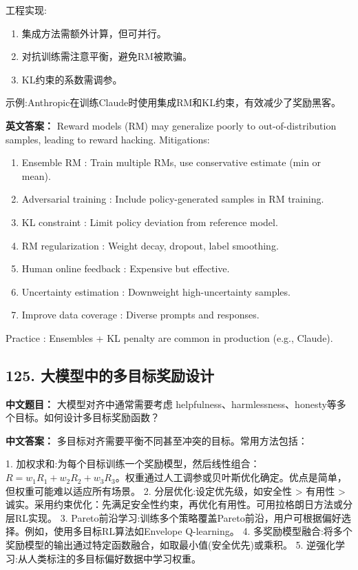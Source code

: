 \documentclass[10pt,a4paper]{ctexart}
\begin{document}
 工程实现:
\begin{enumerate}
    \item 集成方法需额外计算，但可并行。
    \item 对抗训练需注意平衡，避免RM被欺骗。
    \item KL约束的系数需调参。
\end{enumerate}

 示例:Anthropic在训练Claude时使用集成RM和KL约束，有效减少了奖励黑客。

\textbf{英文答案：}  
Reward models (RM) may generalize poorly to out-of-distribution samples, leading to reward hacking. Mitigations:

\begin{enumerate}
    \item Ensemble RM : Train multiple RMs, use conservative estimate (min or mean).
    \item Adversarial training : Include policy-generated samples in RM training.
    \item KL constraint : Limit policy deviation from reference model.
    \item RM regularization : Weight decay, dropout, label smoothing.
    \item Human online feedback : Expensive but effective.
    \item Uncertainty estimation : Downweight high-uncertainty samples.
    \item Improve data coverage : Diverse prompts and responses.
\end{enumerate}

 Practice : Ensembles + KL penalty are common in production (e.g., Claude).

\subsection*{125. 大模型中的多目标奖励设计}
\textbf{中文题目：} 大模型对齐中通常需要考虑 helpfulness、harmlessness、honesty等多个目标。如何设计多目标奖励函数？

\textbf{中文答案：}  
多目标对齐需要平衡不同甚至冲突的目标。常用方法包括：

1.  加权求和:为每个目标训练一个奖励模型，然后线性组合：\(R = w_1 R_1 + w_2 R_2 + w_3 R_3\)。权重通过人工调参或贝叶斯优化确定。优点是简单，但权重可能难以适应所有场景。
2.  分层优化:设定优先级，如安全性 > 有用性 > 诚实。采用约束优化：先满足安全性约束，再优化有用性。可用拉格朗日方法或分层RL实现。
3.  Pareto前沿学习:训练多个策略覆盖Pareto前沿，用户可根据偏好选择。例如，使用多目标RL算法如Envelope Q-learning。
4.  多奖励模型融合:将多个奖励模型的输出通过特定函数融合，如取最小值(安全优先)或乘积。
5.  逆强化学习:从人类标注的多目标偏好数据中学习权重。
\end{document}
